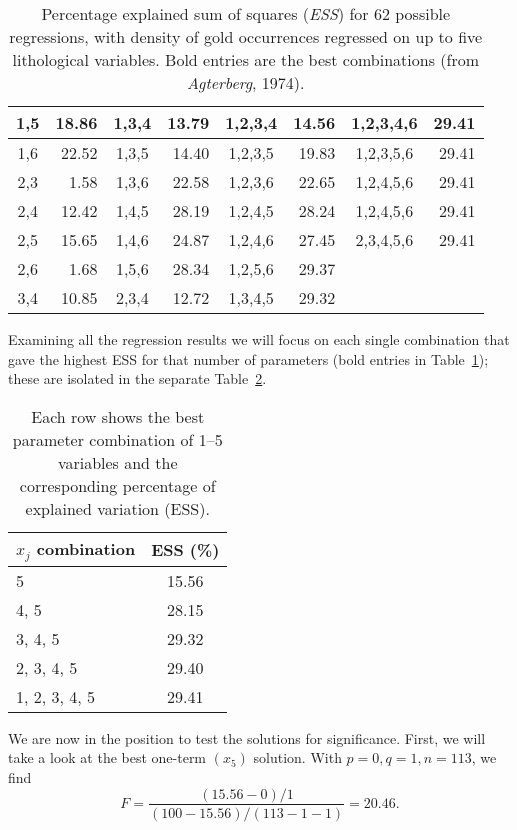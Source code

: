 \begin{example}
\begin{table}[H]
\begin{tabular}{|cr|cr|cr|cr|}
1,5	&	18.86	&	1,3,4	&	13.79	&	1,2,3,4	&	14.56	&	1,2,3,4,6	&	29.41 \\ \hline
1,6	&	22.52	&	1,3,5	&	14.40	&	1,2,3,5	&	19.83	&	1,2,3,5,6	&	29.41 \\ \hline
2,3	&	1.58	&	1,3,6	&	22.58	&	1,2,3,6	&	22.65	&	1,2,4,5,6	&	29.41 \\ \hline
2,4	&	12.42	&	1,4,5	&	28.19	&	1,2,4,5	&	28.24	&	1,2,4,5,6	&	29.41 \\ \hline
2,5	&	15.65	&	1,4,6	&	24.87	&	1,2,4,6	&	27.45	&	2,3,4,5,6	&	29.41 \\ \hline
2,6	&	1.68	&	1,5,6	&	28.34	&	1,2,5,6	&	29.37	&			&	      \\ \hline
3,4	&	10.85	&	2,3,4	&	12.72	&	1,3,4,5	&	29.32	&			&	      \\ \hline
\end{tabular}
\caption{Percentage explained sum of squares (\emph{ESS}) for 62 possible regressions, with density of gold
occurrences regressed on up to five lithological variables. Bold entries are the best combinations (from \emph{Agterberg}, 1974).}
\label{tbl:mregress62}
\end{table}
Examining all the regression results we will focus on each single combination that gave the highest ESS for that number of
parameters (bold entries in Table~\ref{tbl:mregress62}); these are isolated in the separate Table~\ref{tbl:xj_fits}.
\begin{table}[H]
\center
\begin{tabular}{|l|c|} \hline
$x_j$ combination & \bf{ESS} (\%) \\ \hline
5 & 15.56\\ \hline
4, 5 & 28.15 \\ \hline
3, 4, 5 & 29.32 \\ \hline
2, 3, 4, 5 & 29.40 \\ \hline
1, 2, 3, 4, 5 & 29.41 \\ \hline
\end{tabular}
\caption{Each row shows the best parameter combination of 1--5 variables and the corresponding percentage of
explained variation (ESS).}
\label{tbl:xj_fits}
\end{table}
We are now in the position to test the solutions for significance.  First, we will take a look at the best
one-term $(x_5)$ solution.  With $p = 0, q = 1, n = 113$, we find
\begin{equation}
F = \frac{(15.56 - 0)/1}{(100 - 15.56)/(113 -1 -1)} = 20.46.
\end{equation}	 

\end{example}
